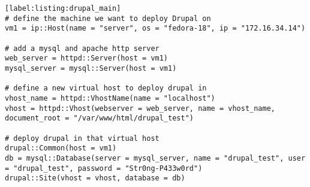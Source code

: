 \begin{minipage}
\begin{lstlisting}[label:listing:drupal_main]
# define the machine we want to deploy Drupal on
vm1 = ip::Host(name = "server", os = "fedora-18", ip = "172.16.34.14")

# add a mysql and apache http server
web_server = httpd::Server(host = vm1)
mysql_server = mysql::Server(host = vm1)

# define a new virtual host to deploy drupal in
vhost_name = httpd::VhostName(name = "localhost")
vhost = httpd::Vhost(webserver = web_server, name = vhost_name, document_root = "/var/www/html/drupal_test")

# deploy drupal in that virtual host
drupal::Common(host = vm1)
db = mysql::Database(server = mysql_server, name = "drupal_test", user = "drupal_test", password = "Str0ng-P433w0rd")
drupal::Site(vhost = vhost, database = db)
\end{lstlisting}
\end{minipage}

